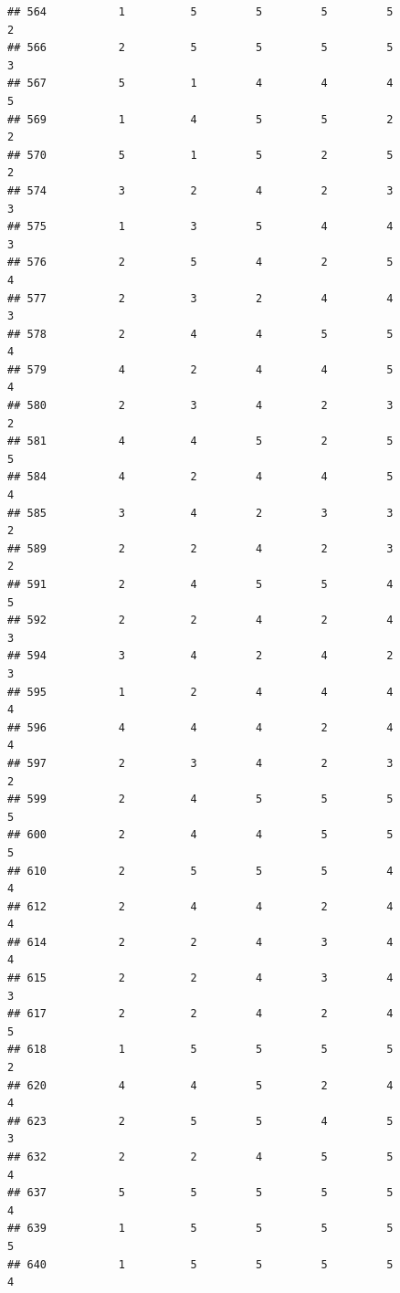 \documentclass[
]{article}
\begin{document}
\begin{verbatim}
## 564           1          5         5         5         5             2
## 566           2          5         5         5         5             3
## 567           5          1         4         4         4             5
## 569           1          4         5         5         2             2
## 570           5          1         5         2         5             2
## 574           3          2         4         2         3             3
## 575           1          3         5         4         4             3
## 576           2          5         4         2         5             4
## 577           2          3         2         4         4             3
## 578           2          4         4         5         5             4
## 579           4          2         4         4         5             4
## 580           2          3         4         2         3             2
## 581           4          4         5         2         5             5
## 584           4          2         4         4         5             4
## 585           3          4         2         3         3             2
## 589           2          2         4         2         3             2
## 591           2          4         5         5         4             5
## 592           2          2         4         2         4             3
## 594           3          4         2         4         2             3
## 595           1          2         4         4         4             4
## 596           4          4         4         2         4             4
## 597           2          3         4         2         3             2
## 599           2          4         5         5         5             5
## 600           2          4         4         5         5             5
## 610           2          5         5         5         4             4
## 612           2          4         4         2         4             4
## 614           2          2         4         3         4             4
## 615           2          2         4         3         4             3
## 617           2          2         4         2         4             5
## 618           1          5         5         5         5             2
## 620           4          4         5         2         4             4
## 623           2          5         5         4         5             3
## 632           2          2         4         5         5             4
## 637           5          5         5         5         5             4
## 639           1          5         5         5         5             5
## 640           1          5         5         5         5             4

\end{verbatim}
\end{document}
